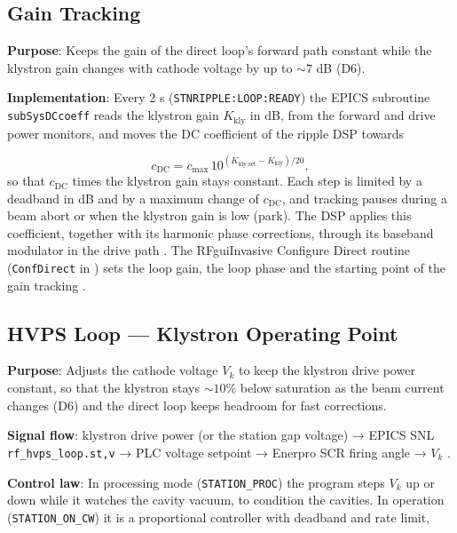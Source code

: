 \subsection{Gain Tracking}\label{sec:loop-gain-tracking}


\textbf{Purpose}: Keeps the gain of the direct loop's forward path constant while the klystron gain changes with cathode voltage by up to \(\sim 7\) dB (D6).

\textbf{Implementation}: Every 2 s (\texttt{STNRIPPLE:\allowbreak{}LOOP:\allowbreak{}READY}) the EPICS subroutine \texttt{subSysDCcoeff}  reads the klystron gain \(K_\text{kly}\) in dB, from the forward and drive power monitors, and moves the DC coefficient of the ripple DSP towards

\begin{equation}\label{eq:gain-track}
c_\text{DC} = c_\text{max}\,10^{(K_\text{kly,set} - K_\text{kly})/20},
\end{equation}
so that \(c_\text{DC}\) times the klystron gain stays constant. Each step is limited by a deadband in dB and by a maximum change of \(c_\text{DC}\), and tracking pauses during a beam abort or when the klystron gain is low (park). The DSP applies this coefficient, together with its harmonic phase corrections, through its baseband modulator in the drive path . The RFguiInvasive Configure Direct routine (\texttt{ConfDirect} in ) sets the loop gain, the loop phase and the starting point of the gain tracking .

\subsection{HVPS Loop --- Klystron Operating Point}\label{sec:loop-hvps}


\textbf{Purpose}: Adjusts the cathode voltage \(V_k\) to keep the klystron drive power constant, so that the klystron stays \(\sim 10\%\) below saturation as the beam current changes (D6) and the direct loop keeps headroom for fast corrections.

\textbf{Signal flow}: klystron drive power (or the station gap voltage) → EPICS SNL \texttt{rf\_\allowbreak{}hvps\_\allowbreak{}loop.\allowbreak{}st,\allowbreak{}v} → PLC voltage setpoint → Enerpro SCR firing angle → \(V_k\) .

\textbf{Control law}: In processing mode (\texttt{STATION\_PROC}) the program steps \(V_k\) up or down while it watches the cavity vacuum, to condition the cavities. In operation (\texttt{STATION\_ON\_CW}) it is a proportional controller with deadband and rate limit,

